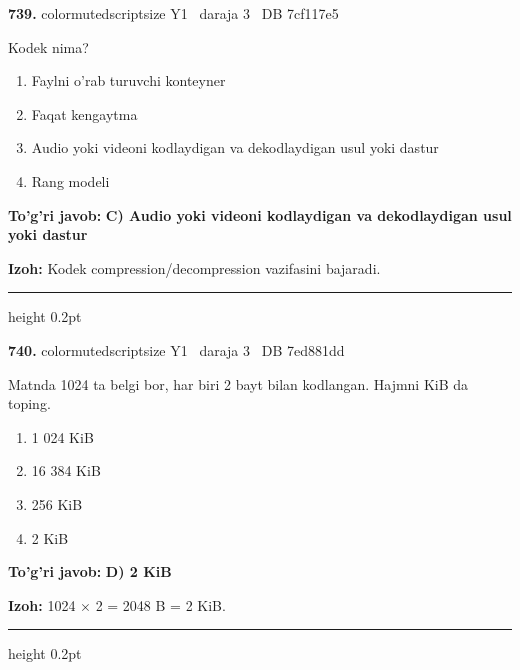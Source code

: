 \documentclass[10pt,a4paper,oneside]{article}
\begin{document}
\noindent\textbf{\color{ink}739.}  {color{muted}scriptsize Y1 \textbullet\ daraja 3 \textbullet\ DB 7cf117e5}
\par
Kodek nima?
\begin{enumerate}[label=\Alph*),leftmargin=9mm]
\item Faylni o'rab turuvchi konteyner
\item Faqat kengaytma
\item Audio yoki videoni kodlaydigan va dekodlaydigan usul yoki dastur
\item Rang modeli
\end{enumerate}
\begin{tcolorbox}[enhanced,breakable,colback=teal!4,colframe=teal!50!black,boxrule=0.5pt,arc=1.1mm,left=3mm,right=3mm,top=1.7mm,bottom=1.7mm,before skip=2mm,after skip=2mm]
\textbf{\color{teal}To'g'ri javob:} \textbf{C) Audio yoki videoni kodlaydigan va dekodlaydigan usul yoki dastur}
\par\smallskip
\textbf{Izoh:} Kodek compression/decompression vazifasini bajaradi.
\end{tcolorbox}
\vspace{2mm}\hrule height 0.2pt \vspace{3mm}

\noindent\textbf{\color{ink}740.}  {color{muted}scriptsize Y1 \textbullet\ daraja 3 \textbullet\ DB 7ed881dd}
\par
Matnda 1024 ta belgi bor, har biri 2 bayt bilan kodlangan. Hajmni KiB da toping.
\begin{enumerate}[label=\Alph*),leftmargin=9mm]
\item 1 024 KiB
\item 16 384 KiB
\item 256 KiB
\item 2 KiB
\end{enumerate}
\begin{tcolorbox}[enhanced,breakable,colback=teal!4,colframe=teal!50!black,boxrule=0.5pt,arc=1.1mm,left=3mm,right=3mm,top=1.7mm,bottom=1.7mm,before skip=2mm,after skip=2mm]
\textbf{\color{teal}To'g'ri javob:} \textbf{D) 2 KiB}
\par\smallskip
\textbf{Izoh:} 1024 \ensuremath{\times} 2 = 2048 B = 2 KiB.
\end{tcolorbox}
\vspace{2mm}\hrule height 0.2pt \vspace{3mm}
\end{document}
